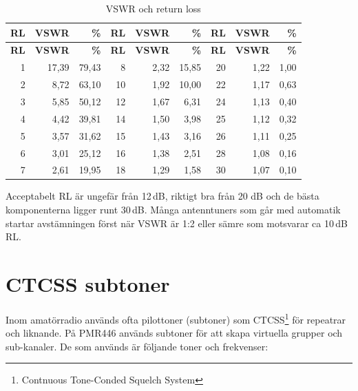 \begin{longtable}{rrr|rrr|rrr}
	\caption{VSWR och return loss}\\
		\textbf{RL} & \textbf{VSWR} & \textbf{\%} & \textbf{RL} & \textbf{VSWR} & \textbf{\%} & \textbf{RL} & \textbf{VSWR} & \textbf{\%} \\ \hline
	\endfirsthead
	\textbf{RL} & \textbf{VSWR} & \textbf{\%} & \textbf{RL} & \textbf{VSWR} & \textbf{\%} & \textbf{RL} & \textbf{VSWR} & \textbf{\%} \\ \hline 	\endhead
	          1 &         17,39 &       79,43 &           8 &          2,32 &       15,85 &          20 &          1,22 &        1,00 \\
	          2 &          8,72 &       63,10 &          10 &          1,92 &       10,00 &          22 &          1,17 &        0,63 \\
	          3 &          5,85 &       50,12 &          12 &          1,67 &        6,31 &          24 &          1,13 &        0,40 \\
	          4 &          4,42 &       39,81 &          14 &          1,50 &        3,98 &          25 &          1,12 &        0,32 \\
	          5 &          3,57 &       31,62 &          15 &          1,43 &        3,16 &          26 &          1,11 &        0,25 \\
	          6 &          3,01 &       25,12 &          16 &          1,38 &        2,51 &          28 &          1,08 &        0,16 \\
	          7 &          2,61 &       19,95 &          18 &          1,29 &        1,58 &          30 &          1,07 &        0,10
\end{longtable}

Acceptabelt RL är ungefär från 12\,dB, riktigt bra från 20 dB och de bästa
komponenterna ligger runt 30\,dB. Många antenntuners som går med automatik
startar avstämningen först när VSWR är 1:2 eller sämre som motsvarar ca
10\,dB\,RL.

\section{CTCSS subtoner}

Inom amatörradio används ofta pilottoner (subtoner) som
CTCSS\footnote{Contnuous Tone-Conded Squelch System} för repeatrar och
liknande. På PMR446 används subtoner för att skapa virtuella grupper och
sub-kanaler. De som används är följande toner och frekvenser:

